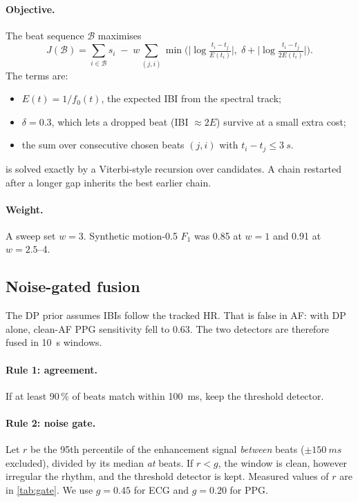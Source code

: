 \documentclass[10pt,a4paper]{article}
\begin{document}
\paragraph{Objective.}
The beat sequence $\mathcal{B}$ maximises
\begin{equation}
  J(\mathcal{B}) = \sum_{i\in\mathcal{B}} s_i \;-\; w\sum_{(j,i)} \min\Big(\Big|\log\tfrac{t_i-t_j}{E(t_i)}\Big|,\;
  \delta + \Big|\log\tfrac{t_i-t_j}{2E(t_i)}\Big|\Big).
  \label{eq:dp}
\end{equation}
The terms are:
\begin{itemize}
  \item $E(t)=1/f_0(t)$, the expected IBI from the spectral track;
  \item $\delta=0.3$, which lets a dropped beat (IBI $\approx 2E$) survive at a small extra cost;
  \item the sum over consecutive chosen beats $(j,i)$ with $t_i-t_j\le\SI{3}{s}$.
\end{itemize}
 is solved exactly by a Viterbi-style recursion over candidates. A chain restarted after a longer gap
inherits the best earlier chain.

\paragraph{Weight.}
A sweep set $w=3$. Synthetic motion-0.5 $F_1$ was 0.85 at $w=1$ and 0.91 at $w=2.5$--4.

\subsection{Noise-gated fusion}\label{sec:fusion}
The DP prior assumes IBIs follow the tracked HR. That is false in AF: with DP alone, clean-AF PPG sensitivity fell to
0.63. The two detectors are therefore fused in \SI{10}{s} windows.

\paragraph{Rule 1: agreement.}
If at least 90\,\% of beats match within \SI{100}{ms}, keep the threshold detector.

\paragraph{Rule 2: noise gate.}
Let $r$ be the 95th percentile of the enhancement signal \emph{between} beats ($\pm\SI{150}{ms}$ excluded), divided by
its median \emph{at} beats. If $r<g$, the window is clean, however irregular the rhythm, and the threshold detector is
kept. Measured values of $r$ are in \cref{tab:gate}. We use $g=0.45$ for ECG and $g=0.20$ for PPG.
\end{document}
